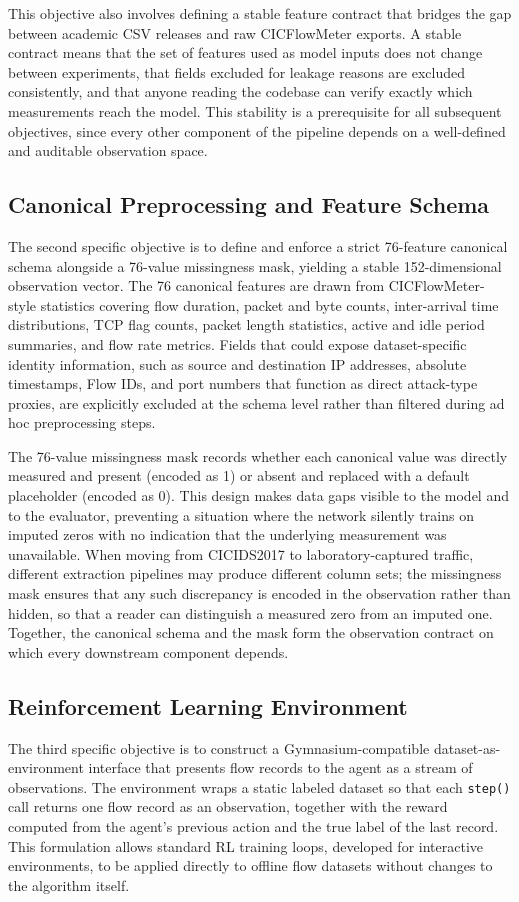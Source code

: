 This objective also involves defining a stable feature contract that bridges the gap between academic CSV releases and raw CICFlowMeter exports. A stable contract means that the set of features used as model inputs does not change between experiments, that fields excluded for leakage reasons are excluded consistently, and that anyone reading the codebase can verify exactly which measurements reach the model. This stability is a prerequisite for all subsequent objectives, since every other component of the pipeline depends on a well-defined and auditable observation space.

\subsection{Canonical Preprocessing and Feature Schema}
The second specific objective is to define and enforce a strict 76-feature canonical schema alongside a 76-value missingness mask, yielding a stable 152-dimensional observation vector. The 76 canonical features are drawn from CICFlowMeter-style statistics covering flow duration, packet and byte counts, inter-arrival time distributions, TCP flag counts, packet length statistics, active and idle period summaries, and flow rate metrics. Fields that could expose dataset-specific identity information, such as source and destination IP addresses, absolute timestamps, Flow IDs, and port numbers that function as direct attack-type proxies, are explicitly excluded at the schema level rather than filtered during ad hoc preprocessing steps.

The 76-value missingness mask records whether each canonical value was directly measured and present (encoded as 1) or absent and replaced with a default placeholder (encoded as 0). This design makes data gaps visible to the model and to the evaluator, preventing a situation where the network silently trains on imputed zeros with no indication that the underlying measurement was unavailable. When moving from CICIDS2017 to laboratory-captured traffic, different extraction pipelines may produce different column sets; the missingness mask ensures that any such discrepancy is encoded in the observation rather than hidden, so that a reader can distinguish a measured zero from an imputed one. Together, the canonical schema and the mask form the observation contract on which every downstream component depends.

\subsection{Reinforcement Learning Environment}
The third specific objective is to construct a Gymnasium-compatible dataset-as-environment interface \parencite{GymnasiumDocs} that presents flow records to the agent as a stream of observations. The environment wraps a static labeled dataset so that each \texttt{step()} call returns one flow record as an observation, together with the reward computed from the agent's previous action and the true label of the last record. This formulation allows standard RL training loops, developed for interactive environments, to be applied directly to offline flow datasets without changes to the algorithm itself.

